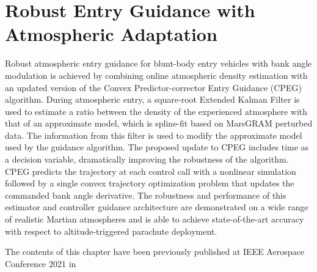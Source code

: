 \graphicspath{{cpeg2/}}


\chapter{Robust Entry Guidance with Atmospheric Adaptation}
\label{sec:cpeg2}

Robust atmospheric entry guidance for blunt-body entry vehicles with bank angle modulation is achieved by combining online atmospheric density estimation with an updated version of the Convex Predictor-corrector Entry Guidance (CPEG) algorithm. During atmospheric entry, a square-root Extended Kalman Filter is used to estimate a ratio between the density of the experienced atmosphere with that of an approximate model, which is spline-fit based on MarsGRAM perturbed data. The information from this filter is used to modify the approximate model used by the guidance algorithm. The proposed update to CPEG includes time as a decision variable, dramatically improving the robustness of the algorithm. CPEG predicts the trajectory at each control call with a nonlinear simulation followed by a single convex trajectory optimization problem that updates the commanded bank angle derivative. The robustness and performance of this estimator and controller guidance architecture are demonstrated on a wide range of realistic Martian atmospheres and is able to achieve state-of-the-art accuracy with respect to altitude-triggered parachute deployment.

The contents of this chapter have been previously published at IEEE Aerospace Conference 2021 in \citet{tracy2023}


